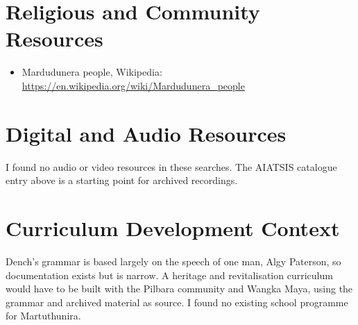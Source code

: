 \documentclass[12pt]{article}
\begin{document}
\section{Religious and Community Resources}
\begin{itemize}
\item Mardudunera people, Wikipedia: \url{https://en.wikipedia.org/wiki/Mardudunera_people}
\end{itemize}

\section{Digital and Audio Resources}
I found no audio or video resources in these searches. The AIATSIS catalogue entry above is a starting point for archived recordings.

\section{Curriculum Development Context}
Dench's grammar is based largely on the speech of one man, Algy Paterson, so documentation exists but is narrow. A heritage and revitalisation curriculum would have to be built with the Pilbara community and Wangka Maya, using the grammar and archived material as source. I found no existing school programme for Martuthunira.
\end{document}
